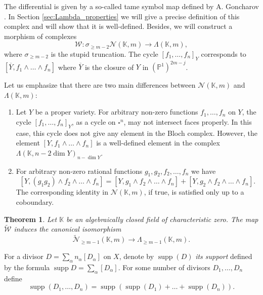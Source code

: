 \documentclass[12pt]{extarticle}
\newtheorem{theorem}{Theorem}[section]
\newtheorem{conjecture}[theorem]{Conjecture}
\def\mb{\mathbb}
\def\mc{\mathcal}
\def\L{\Lambda}
\def\k{\mb K}
\def\N{\mc N}
\def\ol{\overline}
\def\wt{\widetilde}
\renewcommand{\P}{{\mb P}}
\def\wdw{\wedge\dots\wedge}
\def\W{\mc W}
\def \tW{\wt{\W}}
\def \wL{\L_{\geq m-1}}
\def \CH{\mc{N}}
\def \wCH{\wt{\CH}_{\geq m-1}}
\DeclareMathOperator{\supp}{supp}
\begin{document}
The differential is given by a so-called tame symbol map defined by A. Goncharov \cite{goncharov1995geometry}.
In Section \ref{sec:Lambda_properties} we will give a precise definition of this complex and will show that it is well-defined.  Besides, we will construct a morphism of complexes $$\W\colon \sigma_{\geq m-2}\CH(\k,m)\to \L(\k,m),$$
where $\sigma_{\geq m-2}$ is the stupid truncation. The cycle $[f_1,\dots, f_n]_Y$ corresponds to $[\overline Y, f_1\wdw f_n]$ where $\ol Y$ is the closure of $Y$ in $(\P^1)^{2m-j}$.

Let us emphasize that there are two main differences between $\N(\k,m)$ and $\L(\k,m)$:
\begin{enumerate}
    \item Let $Y$ be a proper variety. For arbitrary non-zero functions $f_1,\dots, f_n$ on $Y$, the cycle $[f_1,\dots, f_n]_Y$, as a cycle on $\square^n$, may not intersect faces properly. In this case, this cycle does not give any element in the Bloch complex.  However, the element $[Y,f_1\wdw f_n]$ is a well-defined element in the complex $\L(\k,n-2\dim Y)_{n-\dim Y}$.
    \item For arbitrary non-zero rational functions $g_1,g_2,f_2,\dots, f_n$ we have
    $$[Y, (g_1g_2)\wedge f_2\wdw f_n]=[Y, g_1\wedge f_2\wdw f_n]+[Y, g_2\wedge f_2\wdw f_n].$$
    The corresponding identity in $\N(\k,m)$, if true, is satisfied only up to a coboundary.
\end{enumerate}



\begin{theorem}
\label{th:W_isomorphism_intro}
    Let $\k$ be an algebraically closed field of characteristic zero. The map $\wt {\mc W}$ induces the canonical isomorphism $$\wt{\mc N}_{\geq m-1}(\k,m)\to \Lambda_{\geq m-1}(\k,m).$$
\end{theorem}

For a divisor $D=\sum\limits_{\alpha}n_\alpha[D_\alpha]$ on $X$, denote by $\supp(D)$ \emph{its support} defined by the formula $\supp D=\sum\limits_{\alpha} [D_\alpha]$. For some number of divisors $D_1,\dots, D_n$ define $$\supp(D_1,\dots, D_n)=\supp(\supp(D_1)+\dots+\supp(D_n)).$$
\end{document}
